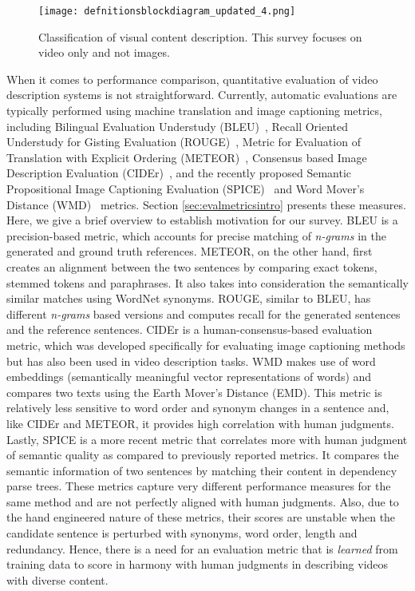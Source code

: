 \documentclass[10pt,journal,compsoc]{IEEEtran}
\begin{document}
\begin{figure}[htbp] %
   \centering
   \texttt{[image: defnitionsblockdiagram\_updated\_4.png]} 
  \vspace{-4mm}
  \caption{Classification of visual content description. This survey focuses on video only and not images.}  
   \label{fig:captioningmodules}
\vspace{-4mm}
\end{figure}

When it comes to performance comparison, quantitative evaluation of video description systems is not straightforward. Currently, automatic evaluations are typically performed using machine translation and image captioning metrics, including Bilingual Evaluation Understudy (BLEU)~\cite{papineni2002bleu}, Recall Oriented Understudy for Gisting Evaluation (ROUGE)~\cite{lin2004rouge}, Metric for Evaluation of Translation with Explicit Ordering (METEOR)~\cite{lavie2005meteor}, Consensus based Image Description Evaluation (CIDEr)~\cite{vedantam2015cider}, and the recently proposed Semantic Propositional Image Captioning Evaluation (SPICE)~\cite{anderson2016spice} and Word Mover's Distance (WMD)~\cite{kusner2015word} metrics. Section \ref{sec:evalmetricsintro} presents these measures. Here, we give a brief overview to establish motivation for our survey. BLEU is a precision-based metric, which accounts for precise matching of \textit{n-grams} in the generated and ground truth references. METEOR, on the other hand, first creates an alignment between the two sentences by comparing exact tokens, stemmed tokens and paraphrases. It also takes into consideration the semantically similar matches using WordNet synonyms. ROUGE, similar to BLEU, has different \textit{n-grams} based versions and computes recall for the generated sentences and the reference sentences. CIDEr is a human-consensus-based evaluation metric, which was developed specifically for evaluating image captioning methods but has also been used in video description tasks. WMD makes use of word embeddings (semantically meaningful vector representations of words) and compares two texts using the Earth Mover's Distance (EMD). This metric is relatively less sensitive to word order and synonym changes in a sentence and, like CIDEr and METEOR, it provides high correlation with human judgments. Lastly, SPICE is a more recent metric that correlates more with human judgment of semantic quality as compared to previously reported metrics. It compares the semantic information of two sentences by matching their content in dependency parse trees. These metrics capture very different performance measures for the same method and are not perfectly aligned with human judgments. 
Also, due to the hand engineered nature of these metrics, their scores are unstable when the candidate sentence is perturbed with synonyms, word order, length and redundancy. Hence, there is a need for an evaluation metric that is {\em learned} from training data to score in harmony with human judgments in describing videos with diverse content.
\end{document}
